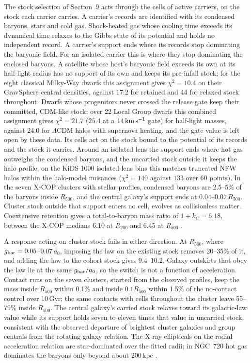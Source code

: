 \documentclass[11pt]{article}
\begin{document}
The stock selection of Section~9 acts through the cells of active carriers, on the stock each carrier carries. A carrier's records are identified with its condensed baryons, stars and cold gas. Shock-heated gas whose cooling time exceeds its dynamical time relaxes to the Gibbs state of its potential and holds no independent record. A carrier's support ends where its records stop dominating the baryonic field. For an isolated carrier this is where they stop dominating the enclosed baryons. A satellite whose host's baryonic field exceeds its own at its half-light radius has no support of its own and keeps its pre-infall stock; for the eight classical Milky-Way dwarfs this assignment gives $\chi^2=10.4$ on their GravSphere central densities, against $17.2$ for retained and $44$ for relaxed stock throughout. Dwarfs whose progenitors never crossed the release gate keep their committed, CDM-like stock; over 22 Local Group dwarfs this combined assignment gives $\chi^2=21.7$ ($25.4$ at a $14\,{\rm km\,s^{-1}}$ gate) for half-light masses, against $24.0$ for $\Lambda$CDM halos with supernova heating, and the gate value is left open by these data. Its cells act on the stock bound to the potential of its records and the stock it carries. Around an isolated lens the support ends where hot gas outweighs the condensed baryons, and the uncarried stock outside it keeps the halo profile; on the KiDS-1000 isolated-lens bins this matches truncated NFW halos within the halo-model nuisances ($\chi^2=140$ against $133$ over 60 points). In the seven X-COP clusters with stellar profiles, condensed baryons are 2.5--5\% of the baryons inside $R_{500}$, and the central galaxy's support ends at $0.04$--$0.07\,R_{500}$. Cluster stock outside that support enters no cell, evolves as collisionless matter. Coextensive retention gives a total-to-baryon mass ratio of $1+k_C=6.18$, between the X-COP medians $6.10$ at $R_{200}$ and $6.45$ at $R_{500}$ \citep{Ettori2019Cluster}.

A response acting on cluster stock fails in either direction. At $R_{500}$, where $g_{\rm bar}=0.05$--$0.07\,a_0$, imposing the law on the existing stock removes 20--35\% of it, and adding the law to the cohort stock gives $9.4$--$10.2$. Galaxy outskirts that obey the law lie at the same $g_{\rm bar}/a_0$, so the switch is not a function of acceleration. Contact runs on the seven clusters, started from the observed profiles, keep the mass inside $R_{500}$ within 0.1\% and inside $0.1R_{500}$ within 1.5\% of the no-contact control over 10\,Gyr; the same contacts with cells throughout the cluster leave 55--79\% inside $R_{500}$. The central galaxy's carried stock relaxes toward its galactic-law value while its support holds seven to eleven times that value in uncarried stock, consistent with the observed departure of brightest cluster galaxies and group centrals from the rotating-galaxy relation. The X-ray ellipticals on the radial acceleration relation \citep{Lelli2017RAR} are star-dominated over the fitted radii; in NGC~720 hot gas dominates the baryons only beyond about 200\,kpc \citep{Humphrey2011N720}.
\end{document}
